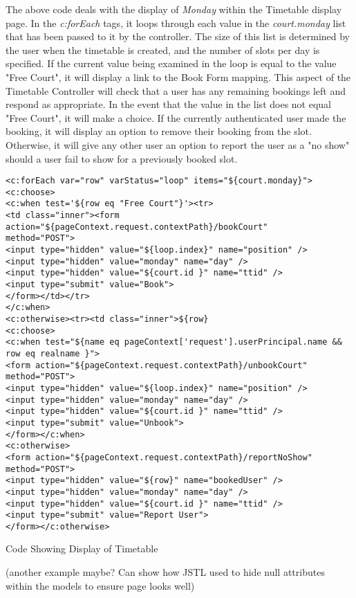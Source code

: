The above code deals with the display of \textit{Monday} within the Timetable display page. In the \textit{c:forEach} tags, it loops through each value in the \textit{court.monday} list that has been passed to it by the controller. The size of this list is determined by the user when the timetable is created, and the number of slots per day is specified. If the current value being examined in the loop is equal to the value "Free Court", it will display a link to the Book Form mapping. This aspect of the Timetable Controller will check that a user has any remaining bookings left and respond as appropriate. In the event that the value in the list does not equal "Free Court", it will make a choice. If the currently authenticated user made the booking, it will display an option to remove their booking from the slot. Otherwise, it will give any other user an option to report the user as a "no show" should a user fail to show for a previously booked slot. \newline

\begin{table}[H]
\begin{lstlisting}
<c:forEach var="row" varStatus="loop" items="${court.monday}">
<c:choose>
<c:when test='${row eq "Free Court"}'><tr>
<td class="inner"><form action="${pageContext.request.contextPath}/bookCourt"
method="POST">
<input type="hidden" value="${loop.index}" name="position" />
<input type="hidden" value="monday" name="day" /> 
<input type="hidden" value="${court.id }" name="ttid" />
<input type="submit" value="Book">
</form></td></tr>
</c:when>
<c:otherwise><tr><td class="inner">${row}
<c:choose>
<c:when test="${name eq pageContext['request'].userPrincipal.name && row eq realname }">
<form action="${pageContext.request.contextPath}/unbookCourt" method="POST">
<input type="hidden" value="${loop.index}" name="position" />
<input type="hidden" value="monday" name="day" /> 
<input type="hidden" value="${court.id }" name="ttid" /> 
<input type="submit" value="Unbook">
</form></c:when>
<c:otherwise>
<form action="${pageContext.request.contextPath}/reportNoShow" method="POST">
<input type="hidden" value="${row}" name="bookedUser" />
<input type="hidden" value="monday" name="day" /> 
<input type="hidden" value="${court.id }" name="ttid" /> 
<input type="submit" value="Report User">
</form></c:otherwise>
\end{lstlisting}
\caption{Code Showing Display of Timetable}
\end{table}

(another example maybe? Can show how JSTL used to hide null attributes within the models to ensure page looks well)
 
